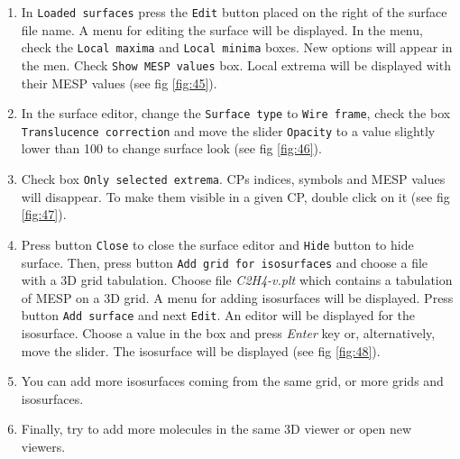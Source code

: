 \documentclass[a4paper,10pt]{article}
\begin{document}
\begin{enumerate}
\item In \texttt{Loaded surfaces} press the \texttt{Edit} button placed
on the right of the surface file name. A menu for editing the 
surface will be displayed. In the menu, check the \texttt{Local maxima} and
\texttt{Local minima} boxes. New options will appear in the men. Check
\texttt{Show MESP values} box. Local extrema will be displayed with
their MESP values (see fig \ref{fig:45}). 

\item In the surface editor, change the \texttt{Surface type}
to \texttt{Wire frame}, check the box \texttt{Translucence correction}
and move the slider \texttt{Opacity} to a value slightly lower than 100
to change surface look (see fig \ref{fig:46}). 

\item Check box \texttt{Only selected extrema}. CPs indices, symbols and 
MESP values will disappear. To make them visible in a given CP, double click 
on it (see fig \ref{fig:47}).

\item Press button \texttt{Close} to close the surface editor and \texttt{Hide}
button to hide surface. Then, press button \texttt{Add grid for isosurfaces}
and choose a file with a 3D grid tabulation. Choose file {\it C2H4-v.plt}
which contains a tabulation of MESP on a 3D grid. A menu for adding isosurfaces
will be displayed. Press button \texttt{Add surface} and next \texttt{Edit}.
An editor will be displayed for the isosurface. Choose a value in the box and
press {\it Enter} key or, alternatively, move the slider. The isosurface will
be displayed (see fig \ref{fig:48}).

\item You can add more isosurfaces coming from the same grid, or more grids and
isosurfaces.

\item Finally, try to add more molecules in the same 3D viewer or open new viewers.





\end{enumerate}
\end{document}

